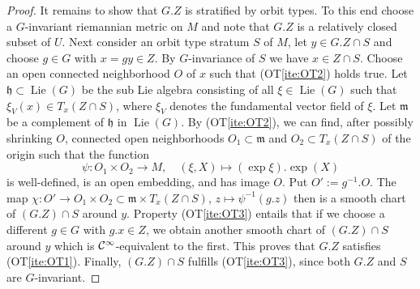 \begin{proof}
   It remains to show that $G.Z$ is stratified by orbit types. To this end choose a 
   $G$-invariant riemannian metric on $M$ and note that $G.Z$ is a relatively closed 
   subset of $U$. Next consider an orbit type stratum $S$ of $M$, let $y\in G.Z \cap S$ 
   and choose $g\in G$ with $x = gy \in Z$. By $G$-invariance of $S$ we have 
   $x \in Z \cap S$. 
   Choose an open connected neighborhood $O$ of $x$ such that (OT\ref{ite:OT2}) holds true. Let 
   $\mathfrak{h} \subset \operatorname{Lie} (G)$ be the sub Lie algebra consisting of all 
   $\xi \in \operatorname{Lie} (G)$ such that $\xi_V (x) \in T_x (Z\cap S)$, where $\xi_V$ 
   denotes the fundamental  vector field of $\xi$. Let $\mathfrak{m}$ be a complement of $\mathfrak{h}$
   in $\operatorname{Lie} (G)$. By (OT\ref{ite:OT2}),  we can find, after possibly shrinking $O$,  
   connected open neighborhoods $O_1 \subset \mathfrak{m}$ and $O_2 \subset T_x(Z\cap S)$ of the origin 
   such that the function
   \[
     \psi : O_1 \times O_2 \to M, \quad (\xi,X) \mapsto (\exp\xi) . \exp(X)
   \] 
   is well-defined, is an open embedding, and has image $O$.  Put $O' := g^{-1}.O$. The map 
   $\chi : O' \to O_1 \times O_2 \subset \mathfrak{m} \times T_x(Z\cap S)$, $z \mapsto \psi^{-1} ( g . z)$ 
   then is a smooth chart of $(G.Z) \cap S$ around $y$. 
   Property  (OT\ref{ite:OT3}) entails that if we choose a different $g \in G$ with 
   $g.x \in Z$, we obtain another smooth chart of $(G.Z) \cap S$ around $y$ which is 
   $\mathcal{C}^\infty$-equivalent to the first. This proves that $G.Z$ satisfies (OT\ref{ite:OT1}). 
   Finally, $(G.Z) \cap S$ fulfills (OT\ref{ite:OT3}), since 
   both $G.Z$ and $S$ are $G$-invariant.  
\end{proof}


